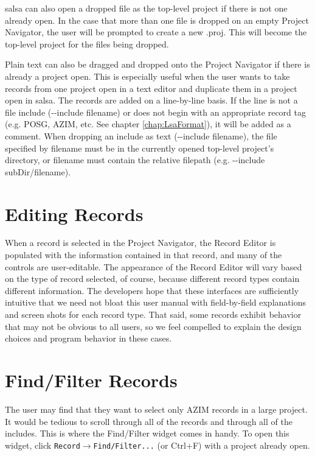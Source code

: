 \textsf{salsa} can also open a dropped file as the top-level project if there is not one already open. In the case that more than one file is dropped on an empty Project Navigator, the user will be prompted to create a new \textsf{.proj}.  This will become the top-level project for the files being dropped.

Plain text can also be dragged and dropped onto the Project Navigator if there is already a project open.  This is especially useful when the user wants to take records from one project open in a text editor and duplicate them in a project open in \textsf{salsa}.  The records are added on a line-by-line basis.  If the line is not a file include (\textsf{-{}-include filename}) or does not begin with an appropriate record tag (e.g. \textsf{POSG}, \textsf{AZIM}, etc. See chapter \ref{chap:LsaFormat}), it will be added as a comment. When dropping an include as text (\textsf{-{}-include filename}), the file specified by \textsf{filename} must be in the currently opened top-level project's directory, or \textsf{filename} must contain the relative filepath (e.g. \textsf{-{}-include subDir/filename}).

\section{Editing Records}
When a record is selected in the Project Navigator, the Record Editor is populated with the information contained in that record, and many of the controls are user-editable.  The appearance of the Record Editor will vary based on the type of record selected, of course, because different record types contain different information.  The developers hope that these interfaces are sufficiently intuitive that we need not bloat this user manual with field-by-field explanations and screen shots for each record type.  That said, some records exhibit behavior that may not be obvious to all users, so we feel compelled to explain the design choices and program behavior in these cases.

\section{Find/Filter Records}
The user may find that they want to select only AZIM records in a large project. It would be tedious to scroll through all of the records and through all of the includes. This is where the Find/Filter widget comes in handy. To open this widget, click \verb+Record+$\rightarrow$\verb+Find/Filter...+ (or Ctrl+F) with a project already open.

